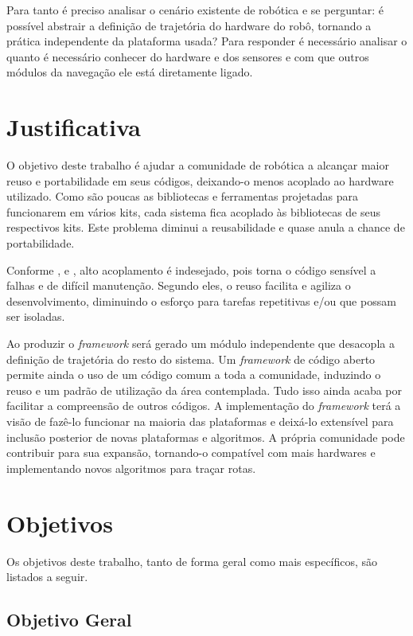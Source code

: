 Para tanto é preciso analisar o cenário existente de robótica e se perguntar: é possível abstrair a definição de trajetória do hardware do robô, tornando a prática independente da plataforma usada? Para responder é necessário analisar o quanto é necessário conhecer do hardware e dos sensores e com que outros módulos da navegação ele está diretamente ligado.

\section{Justificativa}

O objetivo deste trabalho é ajudar a comunidade de robótica a alcançar maior reuso e portabilidade em seus códigos, deixando-o menos acoplado ao hardware utilizado. Como são poucas as bibliotecas e ferramentas projetadas para funcionarem em vários kits, cada sistema fica acoplado às bibliotecas de seus respectivos kits. Este problema diminui a reusabilidade e quase anula a chance de portabilidade.

Conforme \cite{Larman2005}, \cite{Goodliffe2007} e \cite{McConnel2004}, alto acoplamento é indesejado, pois torna o código sensível a falhas e de difícil manutenção. Segundo eles, o reuso facilita e agiliza o desenvolvimento, diminuindo o esforço para tarefas repetitivas e/ou que possam ser isoladas.

Ao produzir o \textit{framework} será gerado um módulo independente que desacopla a definição de trajetória do resto do sistema. Um \textit{framework} de código aberto permite ainda o uso de um código comum a toda a comunidade, induzindo o reuso e um padrão de utilização da área contemplada. Tudo isso ainda acaba por facilitar a compreensão de outros códigos. A implementação do \textit{framework} terá a visão de fazê-lo funcionar na maioria das plataformas e deixá-lo extensível para inclusão posterior de novas plataformas e algoritmos. A própria comunidade pode contribuir para sua expansão, tornando-o compatível com mais hardwares e implementando novos algoritmos para traçar rotas.

\section{Objetivos}

Os objetivos deste trabalho, tanto de forma geral como mais específicos, são listados a seguir.

\subsection{Objetivo Geral}

